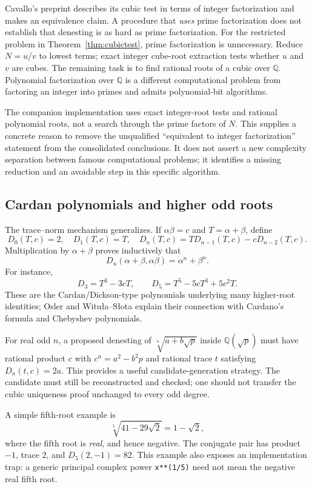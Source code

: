 \documentclass[11pt,a4paper]{article}
\newcommand{\Q}{\mathbb{Q}}
\theoremstyle{definition}
\theoremstyle{remark}
\numberwithin{equation}{section}
\begin{document}
Cavallo's preprint describes its cubic test in terms of integer factorization and makes an equivalence claim. A procedure that \emph{uses} prime factorization does not establish that denesting is as hard as prime factorization. For the restricted problem in Theorem~\ref{thm:cubictest}, prime factorization is unnecessary. Reduce $N=u/v$ to lowest terms; exact integer cube-root extraction tests whether $u$ and $v$ are cubes. The remaining task is to find rational roots of a cubic over $\Q$. Polynomial factorization over $\Q$ is a different computational problem from factoring an integer into primes and admits polynomial-bit algorithms.\cite{cavallo,lll}

The companion implementation uses exact integer-root tests and rational polynomial roots, not a search through the prime factors of $N$. This supplies a concrete reason to remove the unqualified ``equivalent to integer factorization'' statement from the consolidated conclusions. It does not assert a new complexity separation between famous computational problems; it identifies a missing reduction and an avoidable step in this specific algorithm.

\subsection{Cardan polynomials and higher odd roots}

The trace--norm mechanism generalizes. If $\alpha\beta=c$ and $T=\alpha+\beta$, define
\begin{equation}\label{eq:cardanrec}
 D_0(T,c)=2,\quad D_1(T,c)=T,\quad
 D_n(T,c)=T D_{n-1}(T,c)-cD_{n-2}(T,c).
\end{equation}
Multiplication by $\alpha+\beta$ proves inductively that
\[
 D_n(\alpha+\beta,\alpha\beta)=\alpha^n+\beta^n.
\]
For instance,
\[
 D_3=T^3-3cT,\qquad D_5=T^5-5cT^3+5c^2T.
\]
These are the Cardan/Dickson-type polynomials underlying many higher-root identities; Osler and Witu\l a--S\l ota explain their connection with Cardano's formula and Chebyshev polynomials.\cite{osler,witula}

For real odd $n$, a proposed denesting of $\sqrt[n]{a+b\sqrt p}$ inside $\Q(\sqrt p)$ must have rational product $c$ with $c^n=a^2-b^2p$ and rational trace $t$ satisfying $D_n(t,c)=2a$. This provides a useful candidate-generation strategy. The candidate must still be reconstructed and checked; one should not transfer the cubic uniqueness proof unchanged to every odd degree.

A simple fifth-root example is
\begin{equation}\label{eq:fifthquadratic}
 \sqrt[5]{41-29\sqrt2}=1-\sqrt2,
\end{equation}
where the fifth root is \emph{real}, and hence negative. The conjugate pair has product $-1$, trace $2$, and $D_5(2,-1)=82$. This example also exposes an implementation trap: a generic principal complex power \texttt{x**(1/5)} need not mean the negative real fifth root.
\end{document}
